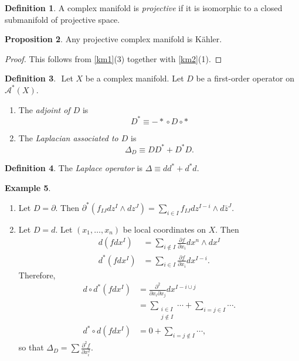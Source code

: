 \documentclass[10pt,letterpaper,cm]{nupset}
\theoremstyle{definition}
\newtheorem{defn}{Definition}[subsection]
\newtheorem{exmp}[defn]{Example}
\theoremstyle{theorem}
\newtheorem{prop}[defn]{Proposition}
\theoremstyle{remark}
\newcommand{\A}{\mathcal A}
\newcommand{\1}{\mathbb{1}}
\newcommand{\0}{\vec 0}
\newcommand{\be}{\begin{enumerate}}
\newcommand{\ee}{\end{enumerate}}
\begin{document}
\begin{defn}
A complex manifold is \textit{projective} if it is isomorphic to a closed submanifold of projective space.
\end{defn}

\begin{prop}
Any projective complex manifold is K\"ahler.
\end{prop}
\begin{proof}
This follows from \cref{km1}(3) together with \cref{km2}(1).
\end{proof}


\begin{defn} $ $
Let $X$ be  a complex manifold. Let $D$ be a first-order operator on $\A^{\ast}\left(X\right)$.  
\be 
\item The \textit{adjoint of $D$} is
\[ 
D^{\ast} \equiv {-\ast} \circ D \circ \ast 
\]
\item The \textit{Laplacian associated to $D$} is 
\[
\Delta_D \equiv D{D^{\ast}} + D^{\ast}{D}.
\]
\ee
\end{defn}

\begin{defn}
The \textit{Laplace operator} is $\Delta \equiv d{d^{\ast}} + d^{\ast}{d}$.
\end{defn}

\begin{exmp} $ $
\be
\item Let $D = \partial$. Then $\partial^{\ast}\left(f_{IJ}d{z}^I \wedge d{z}^J\right) = \sum_{i\in I}f_{IJ}d{z}^{I-i}\wedge d{\bar{z}}^J$.
\item Let $D = d$. Let $\left(x_1, \ldots, x_n\right)$ be local coordinates on $X$. Then
\begin{align*}
d\left(fdx^I\right) & = \sum_{i\notin I} \frac{\partial{f}}{\partial{x_i}}d{x^n}\wedge d{x}^I
\\  d^{\ast}\left(fdx^I\right) & =  \sum_{i\in I}\frac{\partial{f}}{\partial{x_i}}d{x}^{I-i}.
\end{align*}
Therefore,
\begin{align*}
d\circ d^{\ast}\left(fdx^I\right)  & = \frac{\partial^2}{\partial{x_i}\partial{x_j}}d{x}^{I-i \cup j}
\\ & = \sum_{\substack{i\in I \\ j \notin I}}\cdots +\sum_{i=j \in I}\cdots.
\\ d^{\ast}\circ d\left(fd{x}^I\right) &=0 + \sum_{i=j\notin I}\cdots ,
\end{align*}
so that $\Delta_D =\sum \frac{\partial^{2}{f}}{\partial{x_i^2}}$.
\ee
\end{exmp}
\end{document}
